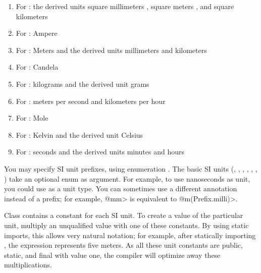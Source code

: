 \begin{enumerate}
\item For :
  the derived units
  square millimeters ,
  square meters , and
  square kilometers 

\item For :
  Ampere 

\item For :
  Meters 
  and the derived units
  millimeters  and
  kilometers 

\item For :
  Candela 

\item For :
  kilograms 
  and the derived unit
  grams 

\item For :
  meters per second  and
  kilometers per hour 

\item For :
  Mole 

\item For :
  Kelvin 
  and the derived unit
  Celsius 

\item For :
  seconds 
  and the derived units
  minutes  and
  hours 
\end{enumerate}


You may specify SI unit prefixes, using enumeration .
The basic SI units
(, , , , ,
 , )
take an optional  enum as argument.
For example, to use nanoseconds as unit, you could use
 as a unit type.
You can sometimes use a different annotation instead of a prefix;
for example, \<@mm> is equivalent to \<@m(Prefix.milli)>.

Class  contains a constant for each SI unit.
To create a value of the particular unit, multiply an unqualified
value with one of these constants.
By using static imports, this allows very natural notation; for
example, after statically importing ,
the expression  represents five meters.
As all these unit constants are public, static, and final with value
one, the compiler will optimize away these multiplications.


